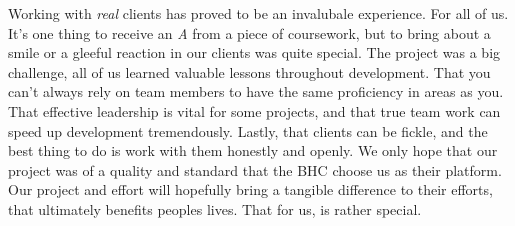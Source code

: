 \documentclass{l3proj}
\begin{document}
Working with \textit{real} clients has proved to be an invalubale experience. For all of us. It's one thing to receive an \textit{A} from a piece of coursework, but to bring about a smile or a gleeful reaction in our clients was quite special. The project was a big challenge, all of us learned valuable lessons throughout development. That you can't always rely on team members to have the same proficiency in areas as you. That effective leadership is vital for some projects, and that true team work can speed up development tremendously. Lastly, that clients can be fickle, and the best thing to do is work with them honestly and openly. We only hope that our project was of a quality and standard that the BHC choose us as their platform. Our project and effort will hopefully bring a tangible difference to their efforts, that ultimately benefits peoples lives. That for us, is rather special.


\newpage


\end{document}
